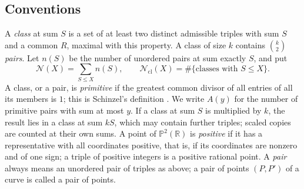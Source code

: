 \documentclass[10pt]{article}
\newcommand{\R}{\mathbb{R}}
\newcommand{\PP}{\mathbb{P}}
\newcommand{\N}{\mathcal{N}}
\newcommand{\Ncl}{\mathcal{N}_{\mathrm{cl}}}
\begin{document}
\subsection{Conventions}\label{sec:conventions}
A \emph{class} at sum $S$ is a set of at least two distinct admissible triples with sum $S$ and a common $R$, maximal with this property. A class of size $k$ contains $\binom k2$ \emph{pairs}. Let $n(S)$ be the number of unordered pairs at sum exactly $S$, and put
\begin{equation}\label{eq:counts}
  \N(X)=\sum_{S\le X}n(S),\qquad \Ncl(X)=\#\{\text{classes with }S\le X\}.
\end{equation}
A class, or a pair, is \emph{primitive} if the greatest common divisor of all entries of all its members is $1$; this is Schinzel's definition \cite[p.~587]{schinzel1996}. We write $A(y)$ for the number of primitive pairs with sum at most $y$. If a class at sum $S$ is multiplied by $k$, the result lies in a class at sum $kS$, which may contain further triples; scaled copies are counted at their own sums. A point of $\PP^2(\R)$ is \emph{positive} if it has a representative with all coordinates positive, that is, if its coordinates are nonzero and of one sign; a triple of positive integers is a positive rational point. A \emph{pair} always means an unordered pair of triples as above; a pair of points $(P,P')$ of a curve is called a pair of points.
\end{document}
